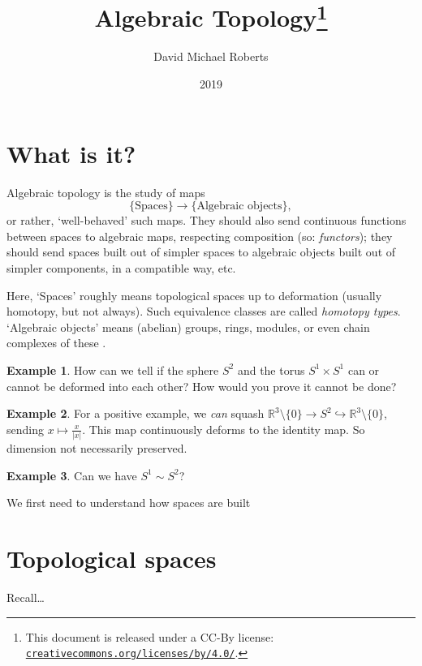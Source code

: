 \documentclass{tufte-handout}
\title{Algebraic Topology\thanks{This document is released under a CC-By license: 
\href{https://creativecommons.org/licenses/by/4.0/}{\texttt{creativecommons.org/licenses/by/4.0/}}.}
}
\author[D.M.~Roberts]{David Michael Roberts}
\date{2019}
\def\into {\hookrightarrow}
\def\RR{\mathbb{R}}
\newcommand{\lecturenum}[1]{\marginnote{\color{red}Lecture #1}}
\theoremstyle{definition}
\newtheorem{example}{Example}
\begin{document}
 

\maketitle

\lecturenum{1} \section{What is it?}

Algebraic topology is the study of maps 
\[
	\{\text{Spaces}\} \longrightarrow \{\text{Algebraic objects}\},
\] 
%
or rather, `well-behaved' such maps. They should also send continuous functions between spaces to 
algebraic maps, respecting composition (so: \emph{functors}); they should send spaces built 
out of simpler spaces to algebraic objects built out of simpler components, in a compatible way, 
etc.

Here, `Spaces' roughly means topological spaces up to deformation (usually homotopy, but 
not always). Such equivalence classes are called \emph{homotopy types}. `Algebraic 
objects' means (abelian) groups, rings, modules, or even chain complexes of these 
.

\begin{example} 
	How can we tell if the sphere $S^2$ and the torus $S^1\times S^1$ can or 
	cannot be deformed into each other? How would you prove it cannot be done? 
\end{example}

\begin{example} 
	For a positive example, we \emph{can} squash $\RR^3 \setminus \{0\} \to S^2 \into 
	\RR^3 \setminus \{0\} $, sending $x\mapsto \frac{x}{|x|}$. This map continuously 
	deforms to the identity map. So dimension not necessarily preserved.
\end{example}

\begin{example} 
	Can we have $S^1 \sim S^2$? 
\end{example} 

\noindent We first need to understand how spaces are built

\section{Topological spaces}

Recall\ldots{}
\end{document}

